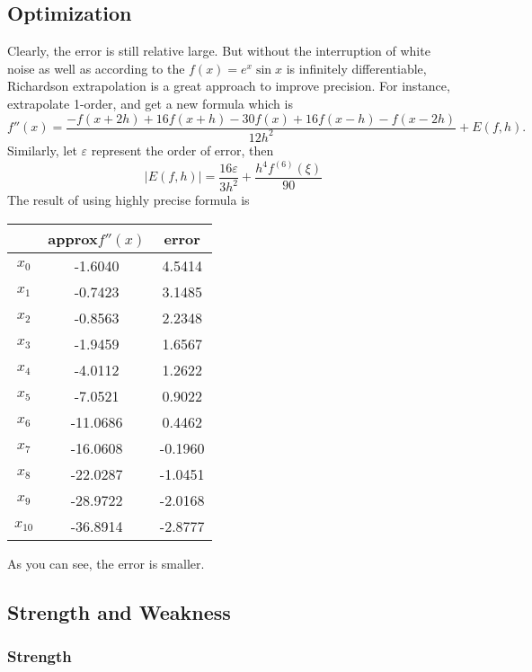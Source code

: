 \documentclass{article}
\begin{document}
\subsection{Optimization}
Clearly, the error is still relative large. But without the interruption of white noise as well as according to the $f(x)=e^x\sin x$ is infinitely differentiable, Richardson extrapolation is a great approach to improve precision.
For instance, extrapolate 1-order, and get a new formula which is
\begin{equation*}
f''(x)=\frac{-f(x+2h)+16f(x+h)-30f(x)+16f(x-h)-f(x-2h)}{12h^2}+E(f,h).
\end{equation*}
Similarly, let $\varepsilon$ represent the order of error, then
\begin{equation*}
  |E(f,h)|=\frac{16\varepsilon}{3h^2}+\frac{h^4f^{(6)}(\xi)}{90}
\end{equation*}
The result of using highly precise formula is
\begin{center}
\begin{tabular}{|c|c|c|}
  \hline
        & approx$f''(x)$ &error\\
  \hline
  $x_0$ &-1.6040 &4.5414\\
  $x_1$ &-0.7423 &3.1485\\
  $x_2$ &-0.8563  &2.2348\\
  $x_3$ &-1.9459  &1.6567\\
  $x_4$ &-4.0112  &1.2622\\
  $x_5$ &-7.0521  &0.9022\\
  $x_6$ &-11.0686 &0.4462\\
  $x_7$ &-16.0608  &-0.1960\\
  $x_8$ &-22.0287 &-1.0451\\
  $x_9$ &-28.9722  &-2.0168\\
  $x_{10}$ &-36.8914  &-2.8777\\
  \hline
\end{tabular}
\end{center}
As you can see, the error is smaller.
\subsection{Strength and Weakness}

\subsubsection{Strength}
\end{document}
